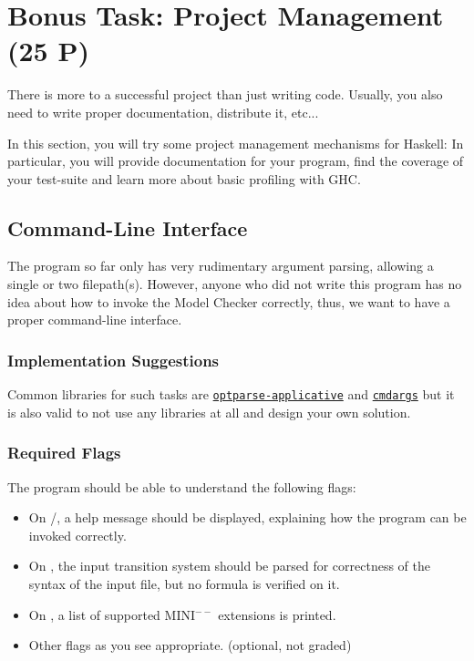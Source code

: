 \documentclass{article}
\begin{document}
\clearpage

\section{Bonus Task: Project Management (25 P)}
\label{sec-bonus}

There is more to a successful project than just writing code. 
Usually, you also need to write proper documentation, distribute it, etc...

In this section, you will try some project management mechanisms for Haskell: 
In particular, you will provide documentation for your program, 
find the coverage of your test-suite and learn more about basic profiling with GHC.

\subsection{Command-Line Interface}

The program so far only has very rudimentary argument parsing, allowing a single or two filepath(s). 
However, anyone who did not write this program has no idea about how to invoke the Model Checker correctly, 
thus, we want to have a proper command-line interface.

\subsubsection*{Implementation Suggestions}

Common libraries for such tasks are \href{https://hackage.haskell.org/package/optparse-applicative}{\texttt{optparse-applicative}} 
and \href{https://hackage.haskell.org/package/cmdargs}{\texttt{cmdargs}} but it is also valid to not use any libraries at all 
and design your own solution.

\subsubsection*{Required Flags}

The program should be able to understand the following flags:

\begin{itemize}
\item On /, a help message should be displayed, explaining how the program can be invoked correctly.
\item On , the input transition system should be parsed for correctness of the syntax of the input file, but no formula is verified on it.
\item On , a list of supported MINI$^{--}$ extensions is printed.
\item Other flags as you see appropriate. (optional, not graded)
\end{itemize}
\end{document}

